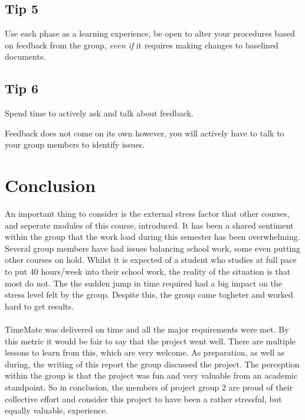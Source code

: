 \documentclass{article}
\begin{document}
    \subsection{Tip 5}
        Use each phase as a learning experience, be open to alter your procedures based on feedback from the group, \emph{even if} it requires making changes to baselined documents.
        
    \subsection{Tip 6}
        Spend time to actively ask and talk about feedback.
        
        Feedback does not come on its own however, you will actively have to talk to your group members to identify issues. 
    
\section{Conclusion \label{conclusion}}
    An important thing to consider is the external stress factor that other courses, and seperate 
    modules of this course, introduced. It has been a shared sentiment within the group that the 
    work load during this semester has been overwhelming. Several group members have had issues 
    balancing school work, some even putting other courses on hold. Whilst it is expected of a 
    student who studies at full pace to put 40 hours/week into their school work, the reality 
    of the situation is that most do not. The the sudden jump in time required had a big impact 
    on the stress level felt by the group. Despite this, the group came togheter and worked hard to get results. 
    \\ \\
    TimeMate was delivered on time and all the major requirements were met. By this metric it would be 
    fair to say that the project went well. There are multiple lessons to learn from this, which are 
    very welcome. As preparation, as well as during, the writing of this report the group discussed the project. The perception within the group is that the project was fun and very valuable from an academic standpoint. So in conclusion, the members of project group 2 are proud of their collective effort and consider 
    this project to have been a rather stressful, but equally valuable, experience. 
    
\newpage
\end{document}
